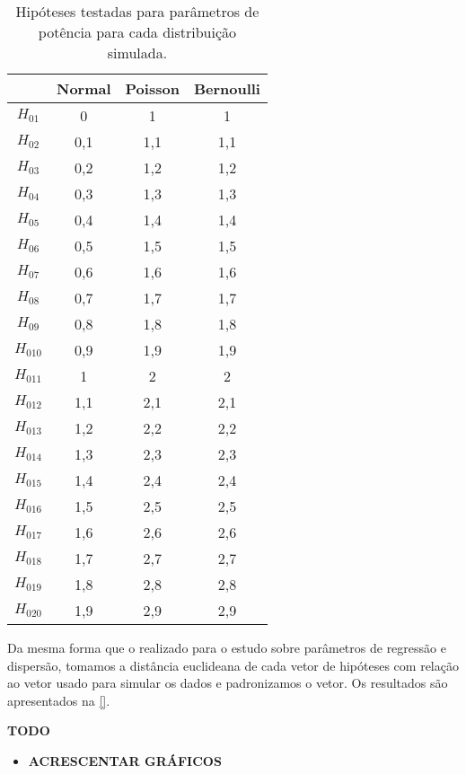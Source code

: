 \begin{table}[H]
\centering
\begin{tabular}{cccc}
\hline
          & Normal & Poisson & Bernoulli \\ \hline
$H_{01}$  & 0      & 1       & 1         \\
$H_{02}$  & 0,1    & 1,1     & 1,1       \\
$H_{03}$  & 0,2    & 1,2     & 1,2       \\
$H_{04}$  & 0,3    & 1,3     & 1,3       \\
$H_{05}$  & 0,4    & 1,4     & 1,4       \\
$H_{06}$  & 0,5    & 1,5     & 1,5       \\
$H_{07}$  & 0,6    & 1,6     & 1,6       \\
$H_{08}$  & 0,7    & 1,7     & 1,7       \\
$H_{09}$  & 0,8    & 1,8     & 1,8       \\
$H_{010}$ & 0,9    & 1,9     & 1,9       \\
$H_{011}$ & 1      & 2       & 2         \\
$H_{012}$ & 1,1    & 2,1     & 2,1       \\
$H_{013}$ & 1,2    & 2,2     & 2,2       \\
$H_{014}$ & 1,3    & 2,3     & 2,3       \\
$H_{015}$ & 1,4    & 2,4     & 2,4       \\
$H_{016}$ & 1,5    & 2,5     & 2,5       \\
$H_{017}$ & 1,6    & 2,6     & 2,6       \\
$H_{018}$ & 1,7    & 2,7     & 2,7       \\
$H_{019}$ & 1,8    & 2,8     & 2,8       \\
$H_{020}$ & 1,9    & 2,9     & 2,9       \\ \hline
\end{tabular}
\caption{Hipóteses testadas para parâmetros de potência para cada distribuição simulada.}
\label{tab:th_p}
\end{table}


Da mesma forma que o realizado para o estudo sobre parâmetros de regressão e dispersão, tomamos a distância euclideana de cada vetor de hipóteses com relação ao vetor usado para simular os dados e padronizamos o vetor. Os resultados são apresentados na \autoref{}.


\textbf{TODO}

\begin{itemize}
  
  \item \textbf{ACRESCENTAR GRÁFICOS}
  
\end{itemize}


